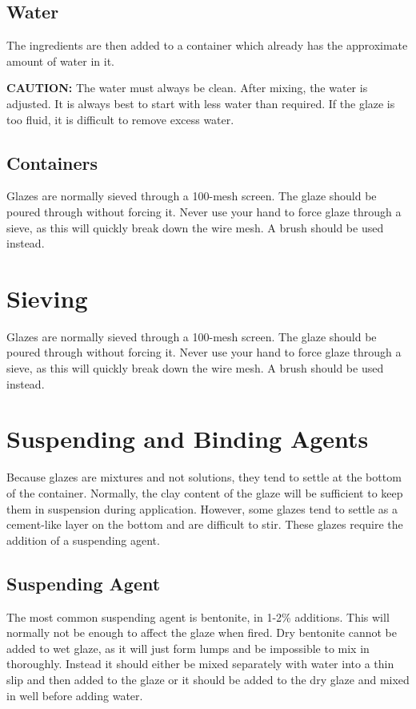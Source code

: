 \subsection{Water}
The ingredients are then added to a container which already has the approximate 
amount of water in it. 

\textbf{CAUTION:} The water must always be clean. After mixing, the water is 
adjusted. It is always best to start with less water than required. If the 
glaze is too fluid, it is difficult to remove excess water.
\subsection{Containers}
Glazes are normally sieved through a 100-mesh screen. The glaze should be 
poured through without forcing it. Never use your hand to force glaze through a 
sieve, as this will quickly break down the wire mesh. A brush should be used 
instead.
\section{Sieving}
Glazes are normally sieved through a 100-mesh screen. The glaze should be 
poured through without forcing it. Never use your hand to force glaze through a 
sieve, as this will quickly break down the wire mesh. A brush should be used 
instead.
\section{Suspending and Binding Agents}
Because glazes are mixtures and not solutions, they tend to settle at the 
bottom of the container. Normally, the clay content of the glaze will be 
sufficient to keep them in suspension during application. However, some glazes 
tend to settle as a cement-like layer on the bottom and are difficult to stir. 
These glazes require the addition of a suspending agent.
\subsection{Suspending Agent}
The most common suspending agent is bentonite, in 1-2\% additions. This will 
normally not be enough to affect the glaze when fired. Dry bentonite cannot be 
added to wet glaze, as it will just form lumps and be impossible to mix in 
thoroughly. Instead it should either be mixed separately with water into a thin 
slip and then added to the glaze or it should be added to the dry glaze and 
mixed in well before adding water.
